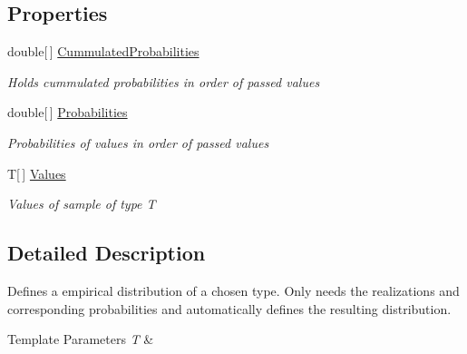 \subsection*{Properties}
\begin{DoxyCompactItemize}
\item 
double\mbox{[}$\,$\mbox{]} \hyperlink{class_simulation_core_1_1_math_tool_1_1_distributions_1_1_empirical_discrete_distribution_a0aafcf9a4e2c43b7dc8f45366324c3c5}{Cummulated\+Probabilities}
\begin{DoxyCompactList}\small\item\em Holds cummulated probabilities in order of passed values \end{DoxyCompactList}\item 
double\mbox{[}$\,$\mbox{]} \hyperlink{class_simulation_core_1_1_math_tool_1_1_distributions_1_1_empirical_discrete_distribution_a1cf1fc016a8476e86f157cb6bb40e66c}{Probabilities}
\begin{DoxyCompactList}\small\item\em Probabilities of values in order of passed values \end{DoxyCompactList}\item 
T\mbox{[}$\,$\mbox{]} \hyperlink{class_simulation_core_1_1_math_tool_1_1_distributions_1_1_empirical_discrete_distribution_a1d9a895a22c7ad371fb99cfbdd56fcce}{Values}
\begin{DoxyCompactList}\small\item\em Values of sample of type T \end{DoxyCompactList}\end{DoxyCompactItemize}


\subsection{Detailed Description}
Defines a empirical distribution of a chosen type. Only needs the realizations and corresponding probabilities and automatically defines the resulting distribution. 


\begin{DoxyTemplParams}{Template Parameters}
{\em T} & \\
\hline
\end{DoxyTemplParams}



